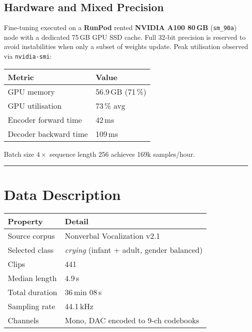 \documentclass{article}
\begin{document}
\hypertarget{hardware-and-mixed-precision}{%
\subsection{Hardware and Mixed
Precision}\label{hardware-and-mixed-precision}}

Fine-tuning executed on a \textbf{RunPod} rented
\textbf{NVIDIA A100 80\,GB} (\texttt{sm\_90a}) node with a dedicated
75\,GB GPU SSD cache. Full 32-bit precision is reserved to avoid
instabilities when only a subset of weights update. Peak utilisation
observed via \texttt{nvidia-smi}:

\begin{longtable}[]{@{}ll@{}}
\toprule
Metric & Value \\
\midrule
\endhead
GPU memory & 56.9\,GB (71\,\%) \\
GPU utilisation & 73\,\% avg \\
Encoder forward time & 42\,ms \\
Decoder backward time & 109\,ms \\
\bottomrule
\end{longtable}

Batch size $4 \times$ sequence length 256 achieves 169k samples/hour.

\begin{center}\rule{0.5\linewidth}{0.5pt}\end{center}

\hypertarget{data-description}{%
\section{Data Description}\label{data-description}}

\begin{longtable}[]{@{}ll@{}}
\toprule
Property & Detail \\
\midrule
\endhead
Source corpus & Nonverbal Vocalization v2.1 \\
Selected class & \emph{crying} (infant + adult, gender balanced) \\
Clips & 441 \\
Median length & 4.9\,s \\
Total duration & 36\,min 08\,s \\
Sampling rate & 44.1\,kHz \\
Channels & Mono, DAC encoded to 9-ch codebooks \\
\bottomrule
\end{longtable}
\end{document}
